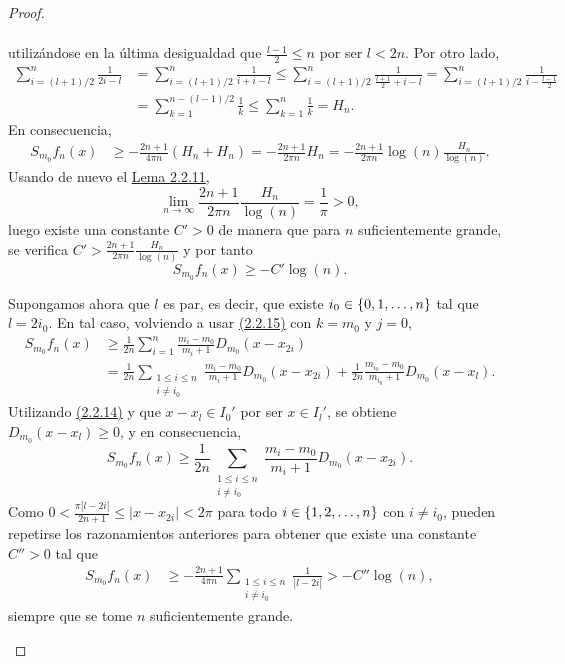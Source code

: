\documentclass[a4paper, 12pt]{book}
\begin{document}
\begin{proof}
\begin{itemize}
\begin{align*}
        \end{align*}
        utilizándose en la última desigualdad que $\frac{l-1}{2} \leq n$ por ser $l < 2n$. Por otro lado,
        \begin{align*}
            \sum_{i=(l+1)/2}^n \frac{1}{2i-l} &= \sum_{i=(l+1)/2}^n \frac{1}{i+i-l} \leq \sum_{i=(l+1)/2}^n \frac{1}{\frac{l+1}{2}+i-l} = \sum_{i=(l+1)/2}^n \frac{1}{i-\frac{l-1}{2}} \\ &= \sum_{k=1}^{n-(l-1)/2}\frac{1}{k} \leq \sum_{k=1}^n \frac{1}{k} = H_n.
        \end{align*}
        En consecuencia,
        \begin{align*}
            S_{m_0}f_n(x) &\geq -\frac{2n+1}{4\pi n}(H_n+H_n) = -\frac{2n+1}{2\pi n}H_n =-\frac{2n+1}{2\pi n}\log(n)\frac{H_n}{\log(n)} .
        \end{align*}
        Usando de nuevo el \hyperref[2.2.11]{Lema 2.2.11},
        \[\lim_{n\to\infty} \frac{2n+1}{2\pi n}\frac{H_n}{\log(n)} = \frac{1}{\pi} > 0,\]
        luego existe una constante $C'>0$ de manera que para $n$ suficientemente grande, se verifica $C' > \frac{2n+1}{2\pi n}\frac{H_n}{\log(n)}$ y por tanto
        \[S_{m_0}f_n(x) \geq -C'\log(n).\]
    
        Supongamos ahora que $l$ es par, es decir, que existe $i_0 \in \{0,1,\mathellipsis,n\}$ tal que $l = 2i_0$. En tal caso, volviendo a usar \hyperref[2.2.15]{(2.2.15)} con $k = m_0$ y $j = 0$,
        \begin{align*}
            S_{m_0}f_n(x) &\geq \frac{1}{2n}\sum_{i=1}^n \frac{m_i-m_0}{m_i+1}D_{m_0}(x-x_{2i}) \\
            &=\frac{1}{2n}\sum_{\substack{1 \leq i \leq n \\ i \neq i_0}} \frac{m_i-m_0}{m_i+1}D_{m_0}(x-x_{2i})+\frac{1}{2n}\frac{m_{i_0}-m_0}{m_{i_0}+1}D_{m_0}(x-x_l).
        \end{align*}
        Utilizando \hyperref[2.2.14]{(2.2.14)} y que $x-x_l \in I_0'$ por ser $x \in I_l'$, se obtiene $D_{m_0}(x-x_l) \geq 0$, y en consecuencia,
        \[S_{m_0}f_n(x) \geq \frac{1}{2n}\sum_{\substack{1 \leq i \leq n \\ i \neq i_0}} \frac{m_i-m_0}{m_i+1}D_{m_0}(x-x_{2i}).\]
        Como $0 < \frac{\pi |l-2i|}{2n+1} \leq |x-x_{2i}|< 2\pi $ para todo $i \in \{1,2,\mathellipsis,n\}$ con $i \neq i_0$, pueden repetirse los razonamientos anteriores para obtener que existe una constante $C'' > 0$ tal que
        \begin{align*}
            S_{m_0}f_n(x) &\geq -\frac{2n+1}{4\pi n}\sum_{\substack{1 \leq i \leq n \\ i \neq i_0}} \frac{1}{|l-2i|} > -C''\log(n),
        \end{align*}
        siempre que se tome $n$ suficientemente grande.


\end{itemize}
\end{proof}
\end{document}
